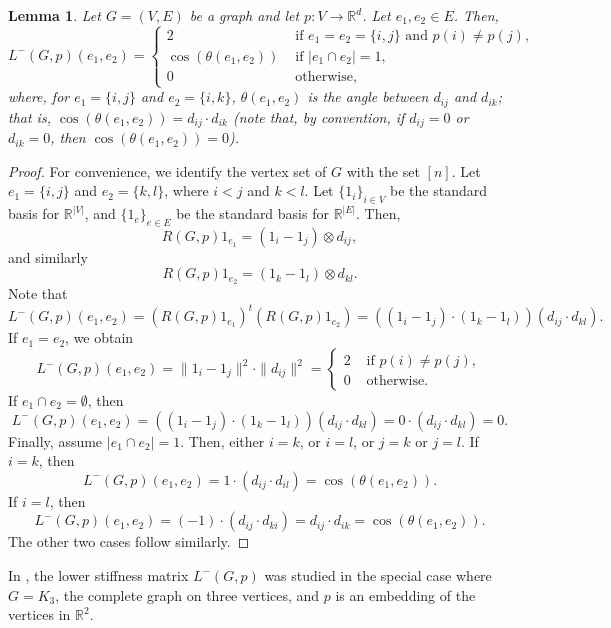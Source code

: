 \documentclass[a4paper,11pt]{article}
\theoremstyle{plain}
\newtheorem{lemma}[theorem]{\bf Lemma}
\theoremstyle{definition}
\newenvironment{remark}[1][Remark.]{\begin{trivlist}
		\item[\hskip \labelsep {\bfseries #1}]}{\end{trivlist}}
\newcommand{\Rea}{{\mathbb R}}
\begin{document}
\begin{lemma}\label{lemma:down_laplacian}
Let $G=(V,E)$ be a graph and let $p:V\to \Rea^d$. Let $e_1,e_2\in E$. Then,
\[
    L^{-}(G,p)(e_1,e_2)= \begin{cases}
                    2 & \text{ if } e_1=e_2=\{i,j\} \text{ and } p(i)\neq p(j),\\
  \cos(\theta(e_1,e_2)) & \text{ if } |e_1\cap e_2|=1,\\
                    0 & \text{ otherwise,}
                    \end{cases} 
\]
where, for $e_1=\{i,j\}$ and $e_2=\{i,k\}$, 
$\theta(e_1,e_2)$ is the angle between $d_{ij}$ and $d_{ik}$; that is, $\cos(\theta(e_1,e_2))=d_{ij}\cdot d_{ik}$ (note that, by convention, if $d_{ij}=0$ or $d_{ik}=0$, then $\cos(\theta(e_1,e_2))=0$).
\end{lemma}
\begin{proof}
For convenience, we identify the vertex set of $G$ with the set $[n]$. Let $e_1=\{i,j\}$ and $e_2=\{k,l\}$, where $i<j$ and $k<l$. Let $\{1_i\}_{i\in V}$ be the standard basis for $\Rea^{|V|}$, and $\{1_e\}_{e\in E}$ be the standard basis for $\Rea^{|E|}$.
Then,
\[
    R(G,p)1_{e_1}= (1_i-1_j)\otimes d_{ij},
\]
and similarly
\[
    R(G,p)1_{e_2}= (1_k-1_l)\otimes d_{kl}.
\]
Note that
\[
L^{-}(G,p)(e_1,e_2)= (R(G,p) 1_{e_1})^t (R(G,p)1_{e_2})= ((1_i-1_j)\cdot(1_k-1_l))(d_{ij}\cdot d_{kl}).
\]
If $e_1=e_2$, we obtain
\[
L^{-}(G,p)(e_1,e_2)= \|1_i-1_j\|^2 \cdot \|d_{ij}\|^2=\begin{cases} 2 & \text{ if } p(i)\neq p(j),\\
0 & \text{ otherwise.}
\end{cases}
\]
If $e_1\cap e_2=\emptyset$, then
\[
L^{-}(G,p)(e_1,e_2)=  ((1_i-1_j)\cdot(1_k-1_l))(d_{ij}\cdot d_{kl})=0\cdot (d_{ij}\cdot d_{kl})=0.
\]
Finally, assume $|e_1\cap e_2|=1$. Then, either $i=k$, or $i=l$, or $j=k$ or $j=l$. If $i=k$, then
\[
L^{-}(G,p)(e_1,e_2)=  1\cdot (d_{ij}\cdot d_{il})= \cos(\theta(e_1,e_2)).
\]
If $i=l$, then
\[
L^{-}(G,p)(e_1,e_2)=  (-1)\cdot (d_{ij}\cdot d_{ki})= d_{ij}\cdot d_{ik}= \cos(\theta(e_1,e_2)).
\]
The other two cases follow similarly.
\end{proof}

\begin{remark} In \cite{aryankia2021spectral}, the lower stiffness matrix $L^{-}(G,p)$ was studied in the special case where $G=K_3$, the complete graph on three vertices, and $p$ is an embedding of the vertices in $\Rea^2$.
\end{remark}
\end{document}
